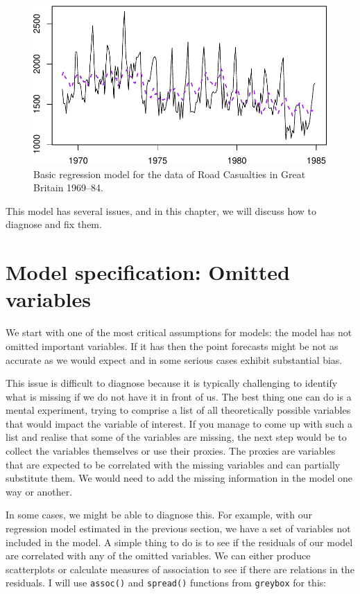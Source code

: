 \documentclass[]{book}
\theoremstyle{definition}
\theoremstyle{definition}
\theoremstyle{definition}
\theoremstyle{definition}
\theoremstyle{remark}
\begin{document}
\begin{figure}
\centering
\includegraphics{Svetunkov--2022----ADAM_files/figure-latex/adamSeat01-1.pdf}
\caption{\label{fig:adamSeat01}Basic regression model for the data of Road Casualties in Great Britain 1969--84.}
\end{figure}

This model has several issues, and in this chapter, we will discuss how to diagnose and fix them.

\hypertarget{diagnosticsOmitted}{%
\section{Model specification: Omitted variables}\label{diagnosticsOmitted}}

We start with one of the most critical assumptions for models: the model has not omitted important variables. If it has then the point forecasts might be not as accurate as we would expect and in some serious cases exhibit substantial bias.

This issue is difficult to diagnose because it is typically challenging to identify what is missing if we do not have it in front of us. The best thing one can do is a mental experiment, trying to comprise a list of all theoretically possible variables that would impact the variable of interest. If you manage to come up with such a list and realise that some of the variables are missing, the next step would be to collect the variables themselves or use their proxies. The proxies are variables that are expected to be correlated with the missing variables and can partially substitute them. We would need to add the missing information in the model one way or another.

In some cases, we might be able to diagnose this. For example, with our regression model estimated in the previous section, we have a set of variables not included in the model. A simple thing to do is to see if the residuals of our model are correlated with any of the omitted variables. We can either produce scatterplots or calculate measures of association \citep[see Section 2.2 and Chapter 6 of][]{SvetunkovSBA} to see if there are relations in the residuals. I will use \texttt{assoc()} and \texttt{spread()} functions from \texttt{greybox} for this:
\end{document}
